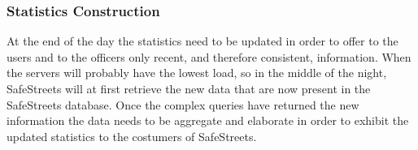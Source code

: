 \subsubsection{Statistics Construction}
At the end of the day the statistics need to be updated in order to offer to the users and to the officers only recent, and therefore consistent, information.
When the servers will probably have the lowest load, so in the middle of the night, SafeStreets will at first retrieve the new data that are now present in the SafeStreets database. Once the complex queries have returned the new information the data needs to be aggregate and elaborate in order to exhibit the updated statistics to the costumers of SafeStreets. 
\\
\\
\\
\\
\\
\clearpage
